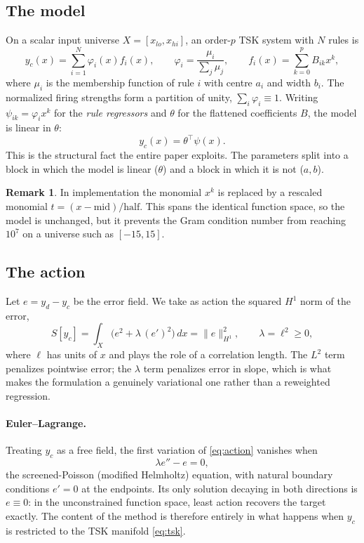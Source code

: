 \documentclass[11pt]{article}
\theoremstyle{plain}
\theoremstyle{definition}
\newtheorem{remark}[theorem]{Remark}
\begin{document}
\subsection{The model}

On a scalar input universe $X=[x_{lo},x_{hi}]$, an order-$p$ TSK system with
$N$ rules is
\begin{equation}
y_c(x)=\sum_{i=1}^{N}\varphi_i(x)f_i(x),\qquad
\varphi_i=\frac{\mu_i}{\sum_{j}\mu_j},\qquad
f_i(x)=\sum_{k=0}^{p}B_{ik}x^{k},
\label{eq:tsk}
\end{equation}
where $\mu_i$ is the membership function of rule $i$ with centre $a_i$ and
width $b_i$. The normalized firing strengths form a partition of unity,
$\sum_i\varphi_i\equiv1$. Writing $\psi_{ik}=\varphi_i x^{k}$ for the
\emph{rule regressors} and $\theta$ for the flattened coefficients $B$, the
model is linear in $\theta$:
\begin{equation}
y_c(x)=\theta^{\top}\psi(x).
\label{eq:linear}
\end{equation}
This is the structural fact the entire paper exploits. The parameters split
into a block in which the model is linear ($\theta$) and a block in which it is
not ($a,b$).

\begin{remark}
In implementation the monomial $x^k$ is replaced by a rescaled monomial
$t=(x-\mathrm{mid})/\mathrm{half}$. This spans the identical function space, so
the model is unchanged, but it prevents the Gram condition number from reaching
$10^{7}$ on a universe such as $[-15,15]$.
\end{remark}

\subsection{The action}

Let $e=y_d-y_c$ be the error field. We take as action the squared $H^1$ norm of
the error,
\begin{equation}
S[y_c]=\int_X\!\Big(e^2+\lambda\,(e')^2\Big)\,dx
=\|e\|_{H^1}^{2},\qquad \lambda=\ell^{2}\ge0,
\label{eq:action}
\end{equation}
where $\ell$ has units of $x$ and plays the role of a correlation length. The
$L^2$ term penalizes pointwise error; the $\lambda$ term penalizes error in
slope, which is what makes the formulation a genuinely variational one rather
than a reweighted regression.

\paragraph{Euler--Lagrange.} Treating $y_c$ as a free field, the first variation
of \eqref{eq:action} vanishes when
\begin{equation}
\lambda e''-e=0,
\label{eq:el}
\end{equation}
the screened-Poisson (modified Helmholtz) equation, with natural boundary
conditions $e'=0$ at the endpoints. Its only solution decaying in both
directions is $e\equiv0$: in the unconstrained function space, least action
recovers the target exactly. The content of the method is therefore entirely in
what happens when $y_c$ is restricted to the TSK manifold \eqref{eq:tsk}.
\end{document}
